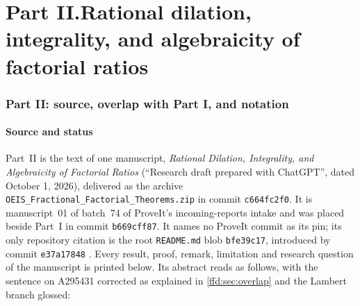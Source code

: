 \documentclass[11pt]{article}
\theoremstyle{definition}
\theoremstyle{remark}
\begin{document}
\clearpage
{}\part*{Part II.\quad Rational dilation, integrality, and algebraicity of factorial ratios}

\smallskip

\section{Part II: source, overlap with Part I, and notation}\label{ffd:sec:preface}
\subsection{Source and status}\label{ffd:sec:source}
Part~II is the text of one manuscript, \emph{Rational Dilation, Integrality,
and Algebraicity of Factorial Ratios} (``Research draft prepared with
ChatGPT'', dated October 1, 2026), delivered as the archive
\texttt{OEIS\_Fractional\_Factorial\_Theorems.zip} in commit
\texttt{c664fc2f0}. It is manuscript~01 of batch~74 of ProveIt's
incoming-reports intake and was placed beside Part~I in commit
\texttt{b669cff87}. It names no ProveIt commit as its pin; its only
repository citation is the root \texttt{README.md} blob
\texttt{bfe39c17}, introduced by commit \texttt{e37a17848}
\cite{ffd-proveit}. Every result, proof, remark, limitation and research
question of the manuscript is printed below. Its abstract reads as follows,
with the sentence on A295431 corrected as explained in
\cref{ffd:sec:overlap} and the Lambert branch glossed:
\end{document}
